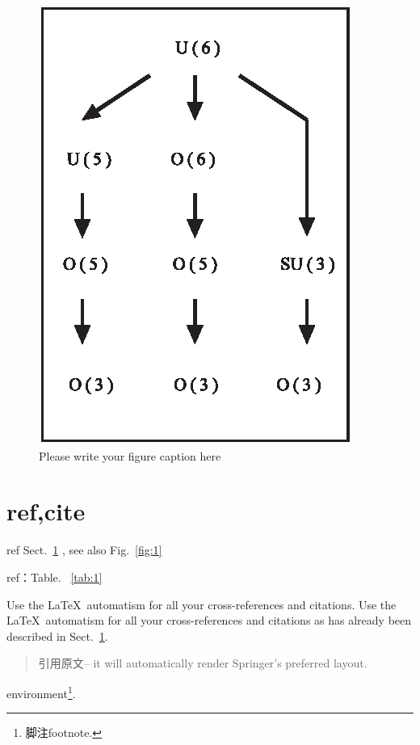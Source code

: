 \begin{figure}[t]
\sidecaption[t]
\includegraphics[scale=.65]{figure}
%
%
\caption{Please write your figure caption here}
\label{fig:2}       %
\end{figure}


\chapter{ref,cite}
\label{sec:2}

ref Sect.~\ref{sec:2} , see also Fig.~\ref{fig:1}

ref：Table. ~\ref{tab:1}

 Use the \LaTeX\ automatism for all your cross-references and citations.
 Use the \LaTeX\ automatism for all your cross-refer\-ences and citations as has already been described in Sect.~\ref{sec:2}.
%

\begin{quotation}
	引用原文-- it will automatically render Springer's preferred layout.
\end{quotation}

environment\footnote{脚注footnote.}.

%
